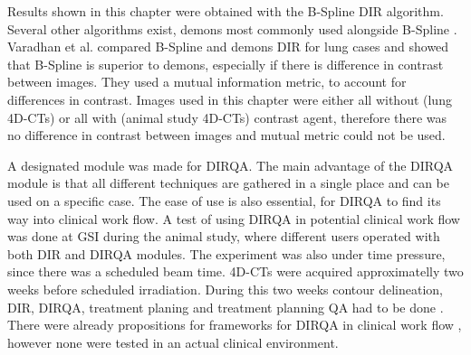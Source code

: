 \documentclass[type=dr, dr=rernat, accentcolor=tud7b,colorbacktitle, bigchapter, openright, twoside, 12pt ]{tudthesis}
\begin{document}
Results shown in this chapter were obtained with the B-Spline DIR algorithm. Several other algorithms exist, demons most commonly used alongside B-Spline \cite{Thirion1998}. Varadhan et al. compared B-Spline and demons DIR
for lung cases \cite{Varadhan2013} and showed that B-Spline is superior to demons, especially if there is difference in contrast between images. They used a mutual information
metric, to account for differences in contrast. Images used in this chapter were either all without (lung 4D-CTs) or all with (animal study 4D-CTs) contrast agent, therefore there was no difference in contrast
between images and mutual metric could not be used.

A designated module was made for DIRQA. The main advantage of the DIRQA module is that all different techniques are gathered in a single place and can be used on a specific case. 
The ease of use is also essential, for DIRQA to find its way into clinical work flow.
A test of using DIRQA in potential clinical work flow was done at GSI during the animal study, where different users operated with both DIR and DIRQA modules. The experiment was also under time pressure, since there was
a scheduled beam time. 4D-CTs were acquired approximatelly two weeks before scheduled irradiation. During this two weeks contour delineation, DIR, DIRQA, treatment planing 
and treatment planning QA had to be done \cite{Lehmann2015}.
There were already propositions for frameworks for DIRQA in clinical work flow \cite{Varadhan2013}, however none were tested in an actual clinical environment.
\end{document}
